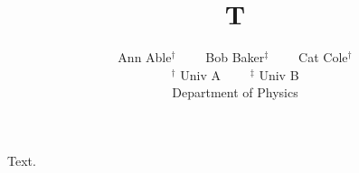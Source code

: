 \documentclass{article}
\title{T}
\author{Ann Able$^{\dagger}$ \ \ \ \ Bob Baker$^{\ddagger}$ \ \ \ \ Cat Cole$^{\dagger}$ \\ $^\dagger$ Univ A \ \ \ \ $^\ddagger$ Univ B \\ Department of Physics}
\begin{document}
\maketitle
Text.
\end{document}

